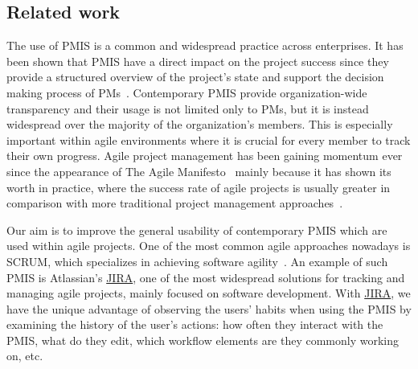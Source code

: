 \documentclass[a4paper, 12pt]{article}
\begin{document}


\subsection{Related work}



The use of PMIS is a common and widespread practice across enterprises. It has been shown that PMIS have a direct impact on the project success since they provide a structured overview of the project's state and support the decision making process of PMs~\cite{RAYMOND2008213}. Contemporary PMIS provide organization-wide transparency and their usage is not limited only to PMs, but it is instead widespread over the majority of the organization's members. This is especially important within agile environments where it is crucial for every member to track their own progress. Agile project management has been gaining momentum ever since the appearance of The Agile Manifesto~\cite{alliance2001agile} mainly because it has shown its worth in practice, where the success rate of agile projects is usually greater in comparison with more traditional project management approaches~\cite{SERRADOR20151040}.

Our aim is to improve the general usability of contemporary PMIS which are used within agile projects. One of the most common agile approaches nowadays is SCRUM, which specializes in achieving software agility~\cite{sutherland2013scrum}. An example of such PMIS is Atlassian's \href{https://www.atlassian.com/software/jira}{JIRA}, one of the most widespread solutions for tracking and managing agile projects, mainly focused on software development. With \href{https://www.atlassian.com/software/jira}{JIRA}, we have the unique advantage of observing the users' habits when using the PMIS by examining the history of the user's actions: how often they interact with the PMIS, what do they edit, which workflow elements are they commonly working on, etc.
\end{document}
